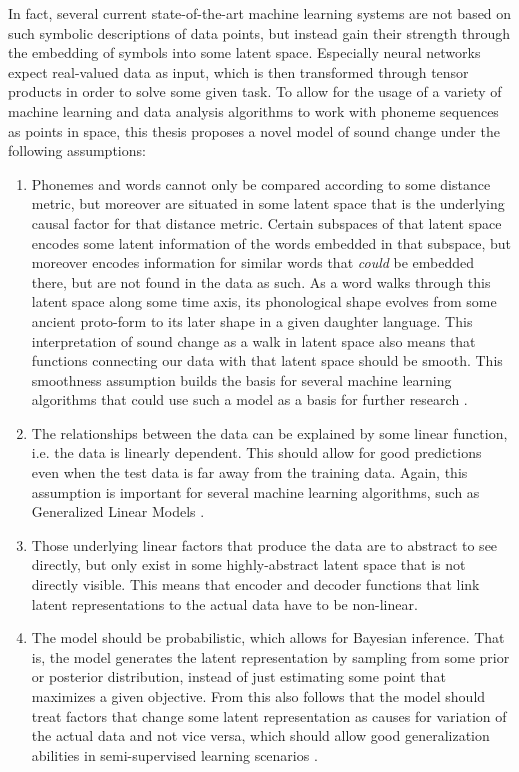 \documentclass[6pt]{article}
\begin{document}
In fact, several current state-of-the-art machine learning systems are not based on such symbolic descriptions of data points, but instead gain their strength through the embedding of symbols into some latent space. Especially neural networks expect real-valued data as input, which is then transformed through tensor products in order to solve some given task. To allow for the usage of a variety of machine learning and data analysis algorithms to work with phoneme sequences as points in space, this thesis proposes a novel model of sound change under the following assumptions:
\begin{enumerate}
\item Phonemes and words cannot only be compared according to some distance metric, but moreover are situated in some latent space that is the underlying causal factor for that distance metric. Certain subspaces of that latent space encodes some latent information of the words embedded in that subspace, but moreover encodes information for similar words that \textit{could} be embedded there, but are not found in the data as such. As a word walks through this latent space along some time axis, its phonological shape evolves from some ancient proto-form to its later shape in a given daughter language. This interpretation of sound change as a walk in latent space also means that functions connecting our data with that latent space should be smooth. 
This smoothness assumption builds the basis for several machine learning algorithms that could use such a model as a basis for further research \citep[p. 557]{Goodfellow-et-al-2016-Book}. 
\item The relationships between the data can be explained by some linear function, i.e. the data is linearly dependent. This should allow for good predictions even when the test data is far away from the training data. Again, this assumption is important for several machine learning algorithms, such as Generalized Linear Models \citep[p. 557]{Goodfellow-et-al-2016-Book}.
\item Those underlying linear factors that produce the data are to abstract to see directly, but only exist in some highly-abstract latent space that is not directly visible. This means that encoder and decoder functions that link latent representations to the actual data have to be non-linear.
\item The model should be probabilistic, which allows for Bayesian inference.  That is, the model generates the latent representation by sampling from some prior or posterior distribution, instead of just estimating some point that maximizes a given objective. From this also follows that the model should treat factors that change some latent representation as causes for variation of the actual data and not vice versa, which should allow good generalization abilities in semi-supervised learning scenarios \citep[p. 557]{Goodfellow-et-al-2016-Book}.

\end{enumerate}
\end{document}
